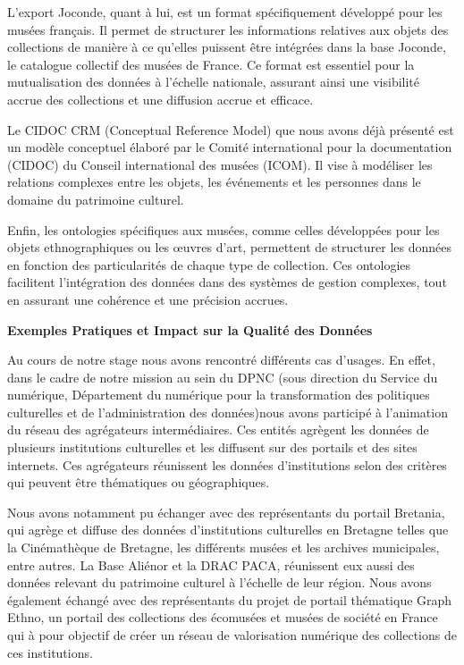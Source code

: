 L'export Joconde, quant à lui, est un format spécifiquement développé pour les musées français. Il permet de structurer les informations relatives aux objets des collections de manière à ce qu'elles puissent être intégrées dans la base Joconde, le catalogue collectif des musées de France. Ce format est essentiel pour la mutualisation des données à l'échelle nationale, assurant ainsi une visibilité accrue des collections et une diffusion accrue et efficace.\newline

Le CIDOC CRM (Conceptual Reference Model) que nous avons déjà présenté est un modèle conceptuel élaboré par le Comité international pour la documentation (CIDOC) du Conseil international des musées (ICOM). Il vise à modéliser les relations complexes entre les objets, les événements et les personnes dans le domaine du patrimoine culturel.\newline

Enfin, les ontologies spécifiques aux musées, comme celles développées pour les objets ethnographiques ou les œuvres d'art, permettent de structurer les données en fonction des particularités de chaque type de collection. Ces ontologies facilitent l'intégration des données dans des systèmes de gestion complexes, tout en assurant une cohérence et une précision accrues.\newline

\textbf{Exemples Pratiques et Impact sur la Qualité des Données}\newline

Au cours de notre stage nous avons rencontré différents cas d’usages. En effet, dans le cadre de notre mission au sein du DPNC (sous direction du Service du numérique, Département du numérique pour la transformation des politiques culturelles et de l'administration des données)nous avons participé à l’animation du réseau des agrégateurs intermédiaires. Ces entités agrègent les données de plusieurs institutions culturelles et les diffusent sur des portails et des sites internets. Ces agrégateurs réunissent les données d'institutions selon des critères qui peuvent être thématiques ou géographiques. \newline

Nous avons notamment pu échanger avec des représentants du portail Bretania, qui agrège et diffuse des données d'institutions culturelles en Bretagne telles que  la Cinémathèque de Bretagne, les différents musées et les archives municipales, entre autres. La Base Aliénor et la DRAC PACA, réunissent eux aussi des données relevant du patrimoine culturel à l’échelle de leur région. Nous avons également échangé avec des représentants du projet de portail thématique Graph Ethno, un portail des collections des écomusées et musées de société en France qui à pour objectif de créer un réseau de valorisation numérique des collections de ces institutions. \newline

